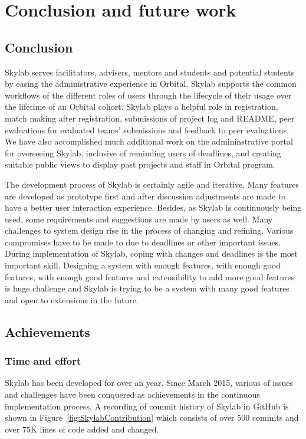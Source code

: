 \chapter{Conclusion and future work} \label{conclusionandfuturework}

\section{Conclusion}

Skylab serves facilitators, advisers, mentors and students and potential students by easing the administrative experience in Orbital. Skylab supports the common workflows of the different roles of users through the lifecycle of their usage over the lifetime of an Orbital cohort.   Skylab plays a helpful role in registration, match making after registration, submissions of project log and README, peer evaluations for evaluated teams' submissions and feedback to peer evaluations. We have also accomplished much additional work on the admininstrative portal for overseeing Skylab, inclusive of reminding users of deadlines, and creating suitable public views to display past projects and staff in Orbital program.

The development process of Skylab is certainly agile and iterative. Many features are developed as prototype first and after discussion adjustments are made to have a better user interaction experience. Besides, as Skylab is continuously being used, some requirements and suggestions are made by users as well. Many challenges to system design rise in the process of changing and refining. Various compromises have to be made to due to deadlines or other important issues. During implementation of Skylab, coping with changes and deadlines is the most important skill. Designing a system with enough features, with enough good features, with enough good features and extensibility to add more good features is huge challenge and Skylab is trying to be a system with many good features and open to extensions in the future.

\section{Achievements}

\subsection{Time and effort}

Skylab has been developed for over an year. Since March 2015, various of issues and challenges have been conquered as achievements in the continuous implementation process. A recording of commit history of Skylab in GitHub is shown in Figure~\ref{fig:SkylabContribution} which consists of over 500 commits and over 75K lines of code added and changed.

